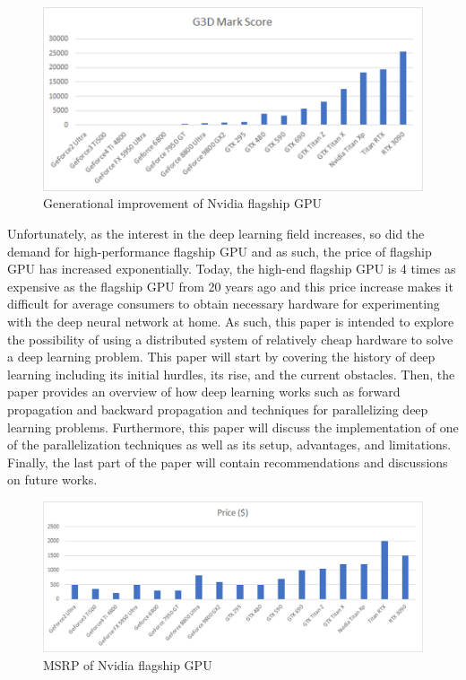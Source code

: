 \documentclass{IEEEtran}
\begin{document}
        \begin{figure}[!htb]
            \centering
            \captionsetup{justification=centering}
            \includegraphics[width=\linewidth]{GPU_Improvment.png}
            \caption{Generational improvement of Nvidia flagship GPU}  
        \end{figure}
        
        Unfortunately, as the interest in the deep learning field increases, so did the demand for high-performance flagship GPU and as such, the price of flagship GPU has increased exponentially. Today, the high-end flagship GPU is 4 times as expensive as the flagship GPU from 20 years ago \cite{passmark_software} and this price increase makes it difficult for average consumers to obtain necessary hardware for experimenting with the deep neural network at home. As such, this paper is intended to explore the possibility of using a distributed system of relatively cheap hardware to solve a deep learning problem. This paper will start by covering the history of deep learning including its initial hurdles, its rise, and the current obstacles. Then, the paper provides an overview of how deep learning works such as forward propagation and backward propagation and techniques for parallelizing deep learning problems. Furthermore, this paper will discuss the implementation of one of the parallelization techniques as well as its setup, advantages, and limitations. Finally, the last part of the paper will contain recommendations and discussions on future works.

        \begin{figure}[!htb]
            \centering
            \captionsetup{justification=centering}
            \includegraphics[width=\linewidth]{GPU_Price.png}
            \caption{MSRP of Nvidia flagship GPU}  
        \end{figure}
\end{document}
